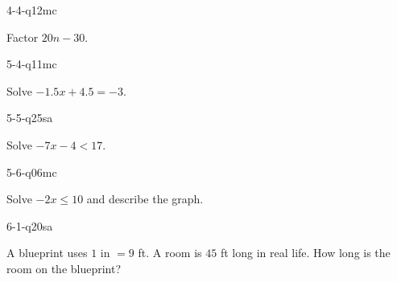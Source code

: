 \begin{practiceQuestion}{4-4-q12}{mc}
\begin{questionText}
Factor $20n - 30$.
\end{questionText}
\end{practiceQuestion}

\begin{practiceQuestion}{5-4-q11}{mc}
\begin{questionText}
Solve $-1.5x + 4.5 = -3$.
\end{questionText}
\end{practiceQuestion}

\begin{practiceQuestion}{5-5-q25}{sa}
\begin{questionText}
Solve $-7x - 4 < 17$.
\end{questionText}
\end{practiceQuestion}

\begin{practiceQuestion}{5-6-q06}{mc}
\begin{questionText}
Solve $-2x \leq 10$ and describe the graph.
\end{questionText}
\end{practiceQuestion}

\begin{practiceQuestion}{6-1-q20}{sa}
\begin{questionText}
A blueprint uses $1$ in $= 9$ ft. A room is $45$ ft long in real life. How long is the room on the blueprint?
\end{questionText}
\end{practiceQuestion}

